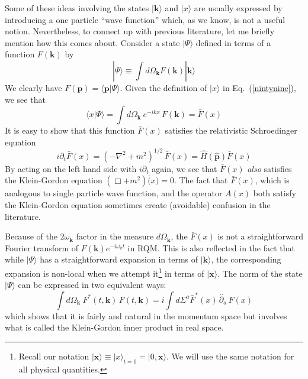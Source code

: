 \documentclass[12pt]{article}
\def\eq#1{{Eq.~(\ref{#1})}}
\def\ket#1{|#1\rangle}                    %
\def\amp#1#2{\langle #1 | #2\rangle}      %
\begin{document}
Some of these ideas involving the states $\ket{\bm{k}}$ and $\ket{x}$ are usually expressed by introducing a one particle ``wave function''
which, as we know, is not a useful notion. Nevertheless, to connect up with previous literature, let me briefly mention how this comes about. Consider a state $\ket{\Psi}$ defined in terms of a function $F(\bm{k})$ by
 \begin{equation}
 \ket{\Psi} \equiv \int d\Omega_{\bm{k}} F(\bm{k}) \ket{\bm{k}} 
  \label{14oct18}
 \end{equation} 
 We clearly have $F(\bm{p}) = \amp{\bm{p}}{\Psi}$. Given the definition of $\ket{x}$ in \eq{nintynine}, we see that 
 \begin{equation}
 \amp{x}{\Psi} = \int d\Omega_{\bm{k}}\ e^{-ikx}\, F(\bm{k}) = \bar F(x)
 \end{equation} 
 It is  easy to show that this function $\bar F(x)$ satisfies the relativistic Schroedinger equation 
 \begin{equation}
 i\partial_t \bar F(x) = (-\nabla^2+ m^2)^{1/2} \, \bar F(x) = \hat H(\hat{\bm{p}}) \bar F(x)
 \end{equation}
 By acting on the left hand side with $i\partial_t$ again, we see that $\bar F(x)$ \textit{also} satisfies the Klein-Gordon equation $(\Box +m^2)\bar (x) =0$. The fact that $\bar F(x)$, which is analogous to single particle wave function, and the operator $A(x)$ both satisfy the Klein-Gordon equation sometimes create (avoidable) confusion in the literature.
 
 Because of the $2\omega_{\bm{k}}$ factor in the measure $d\Omega_{\bm{k}}$, the  $\bar F(x)$ is not a straightforward Fourier transform of $F(\bm{k})e^{-i\omega_k t}$ in RQM. This is also reflected in the fact that while $\ket{\Psi}$ has a straightforward expansion in terms of $\ket{\bm{k}}$, the corresponding expansion is non-local when we attempt it\footnote{Recall our notation 
 $
 \ket{\bm{x}} \equiv \ket{x}_{t=0} = \ket{0,\bm{x}}
 $.  We will use the same notation for all physical quantities.}
 in terms of $\ket{\bm{x}}$.
 The norm of the state $\ket{\Psi}$ can be expressed in two equivalent ways: 
 \begin{equation}
 \int d\Omega_{\bm{k}} \ F^*(t,\bm{k})\, F(t, \bm{k}) = i \int d \Sigma^a \bar F^*(x)\, \overleftrightarrow{\partial_a} \, F(x)
 \end{equation} 
which shows that it is fairly and natural in the momentum space but involves what is called the Klein-Gordon inner product in real space.
 
\end{document}
